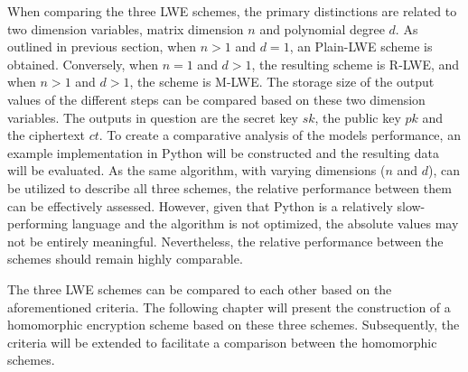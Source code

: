 When comparing the three LWE schemes, the primary distinctions are related to two dimension variables, matrix dimension $n$ and polynomial degree $d$. As outlined in previous section, when $n>1$ and $d=1$, an Plain-LWE scheme is obtained. Conversely, when $n=1$ and $d>1$, the resulting scheme is R-LWE, and when $n>1$ and $d>1$, the scheme is M-LWE. The storage size of the output values of the different steps can be compared based on these two dimension variables. The outputs in question are the secret key $sk$, the public key $pk$ and the ciphertext $ct$. To create a comparative analysis of the models performance, an example implementation in Python will be constructed and the resulting data will be evaluated. As the same algorithm, with varying dimensions ($n$ and $d$), can be utilized to describe all three schemes, the relative performance between them can be effectively assessed. However, given that Python is a relatively slow-performing language and the algorithm is not optimized, the absolute values may not be entirely meaningful. Nevertheless, the relative performance between the schemes should remain highly comparable.

The three LWE schemes can be compared to each other based on the aforementioned criteria. The following chapter will present the construction of a homomorphic encryption scheme based on these three schemes. Subsequently, the criteria will be extended to facilitate a comparison between the homomorphic schemes.
